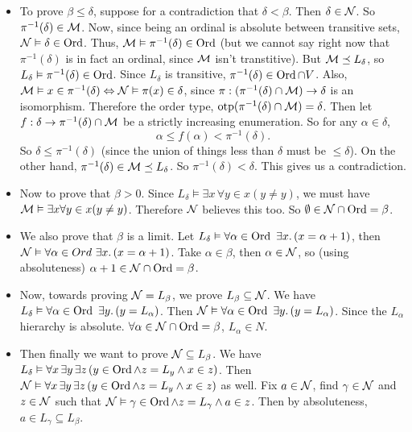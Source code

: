 \documentclass{article}
\begin{document}
\begin{itemize}
    \item To prove $\beta \leq \delta$, suppose for a contradiction that $\delta< \beta$. Then $\delta \in \mathcal{N}$. So $\pi^{-1}(\delta) \in \mathcal{M}$. Now, since being an ordinal is absolute between transitive sets, $\mathcal{N} \vDash \delta \in \operatorname{Ord}$. Thus, $\mathcal{M} \vDash \pi^{-1}(\delta) \in \operatorname{Ord}$ (but we cannot say right now that $\pi^{-1}(\delta)$ is in fact an ordinal, since $\mathcal{M}$ isn't transtitive). But $\mathcal{M} \preceq L_{\delta}$, so $L_{\delta} \vDash \pi^{-1}(\delta) \in \operatorname{Ord}$. Since $L_{\delta}$ is transitive, $\pi^{-1}(\delta) \in \operatorname{Ord} \cap V$. \gap
          Also, $\mathcal{M} \vDash x \in \pi^{-1}(\delta) \Leftrightarrow \mathcal{N} \vDash \pi(x) \in \delta$, since $\pi : (\pi^{-1}(\delta) \cap \mathcal{M}) \to \delta$ is an isomorphism. Therefore the order type, $\operatorname{otp}(\pi^{-1}(\delta) \cap \mathcal{M}) = \delta$. Then let $f : \delta \to \pi^{-1}(\delta) \cap \mathcal{M}$ be a strictly increasing enumeration. So for any $\alpha \in \delta$, \[\alpha \leq f(\alpha) < \pi^{-1}(\delta).\]
          So $\delta \leq \pi^{-1}(\delta)$ (since the union of things less than $\delta$ must be $\leq \delta$). On the other hand, $\pi^{-1}(\delta) \in \mathcal{M} \preceq L_{\delta}$. So $\pi^{-1}(\delta) < \delta$. This gives us a contradiction.
    \item Now to prove that $\beta >0$. Since $L_{\delta} \models \exists x\, \forall y \in x (y \neq y)$, we must have $\mathcal{M} \vDash \exists x \forall y \in x (y \neq y)$. Therefore $\mathcal{N}$ believes this too. So $\emptyset \in \mathcal{N} \cap \operatorname{Ord} =\beta$.
    \item We also prove that $\beta$ is a limit. Let $L_{\delta} \vDash \forall \alpha \in \operatorname{Ord}\,\, \exists x. \, (x = \alpha+1)$, then $\mathcal{N} \vDash \forall \alpha \in Ord \,\, \exists x. \, (x=\alpha+1)$. Take $\alpha \in \beta$, then $\alpha \in \mathcal{N}$, so (using absoluteness) $\alpha+1 \in \mathcal{N} \cap \operatorname{Ord} = \beta$.
    \item Now, towards proving $\mathcal{N} = L_{\beta}$, we prove $L_{\beta} \subseteq \mathcal{N}$. We have $L_{\delta} \vDash \forall \alpha \in \operatorname{Ord} \,\, \exists y.\, (y = L_{\alpha})$. Then $\mathcal{N} \vDash \forall \alpha \in \operatorname{Ord}\,\, \exists y.\, (y=L_{\alpha})$. Since the $L_{\alpha}$ hierarchy is absolute. $\forall \alpha \in \mathcal{N} \cap \operatorname{Ord} = \beta$, $L_{\alpha}\in N$.
    \item Then finally we want to prove $\mathcal{N} \subseteq L_{\beta}$. We have $L_{\delta} \vDash \forall x\, \exists y\, \exists z\, (y \in \operatorname{Ord} \wedge z = L_{y} \wedge x \in z)$. Then $\mathcal{N} \vDash \forall x\, \exists y\, \exists z\, (y \in \operatorname{Ord} \wedge z = L_{y} \wedge x \in z)$ as well. Fix $a \in \mathcal{N}$, find $\gamma \in \mathcal{N}$ and $z \in \mathcal{N}$ such that $\mathcal{N} \vDash \gamma \in \operatorname{Ord} \wedge z=L_{\gamma} \wedge a \in z$. Then by absoluteness, $a \in L_{\gamma} \subseteq L_{\beta}$.
\end{itemize}
\end{document}

